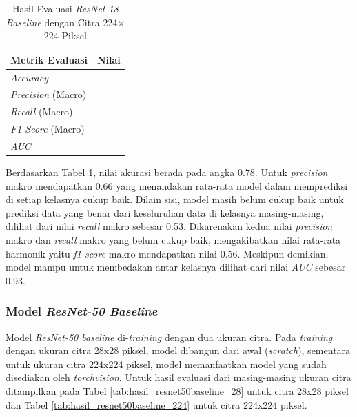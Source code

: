 \begin{table}[H]
    \centering
    \caption{Hasil Evaluasi \textit{ResNet-18 Baseline} dengan Citra 224$\times$224 Piksel}
    \label{tab:hasil_resnet18baseline_224}
    \begin{tabular}{>{\raggedright\arraybackslash}m{} 
                    >{\centering\arraybackslash}m{}}
        \toprule
        \textbf{Metrik Evaluasi} & \textbf{Nilai} \\
        \midrule
        \textit{Accuracy} & 0.78 \\
        \textit{Precision} (Macro) & 0.66 \\
        \textit{Recall} (Macro) & 0.53 \\
        \textit{F1-Score} (Macro) & 0.56 \\
        \textit{AUC} & 0.93 \\
        \bottomrule
    \end{tabular}
\end{table}

Berdasarkan Tabel \ref{tab:hasil_resnet18baseline_224}, nilai akurasi 
berada pada angka 0.78. Untuk \textit{precision} makro mendapatkan 0.66 
yang menandakan rata-rata model dalam memprediksi di setiap kelasnya 
cukup baik. Dilain sisi, model masih belum cukup baik untuk 
prediksi data yang benar dari keseluruhan data di kelasnya masing-masing, 
dilihat dari nilai \textit{recall} makro sebesar 0.53. Dikarenakan kedua 
nilai \textit{precision} makro dan \textit{recall} makro yang belum cukup 
baik, mengakibatkan nilai rata-rata harmonik yaitu \textit{f1-score} makro 
mendapatkan nilai 0.56. Meskipun demikian, model mampu untuk membedakan 
antar kelasnya dilihat dari nilai \textit{AUC} sebesar 0.93. \par


\subsubsection{Model \textit{ResNet-50 Baseline}} \label{IV.Resnet50_Baseline}
Model \textit{ResNet-50 baseline} di-\textit{training} dengan dua ukuran 
citra. Pada \textit{training} dengan ukuran citra 28x28 piksel, model 
dibangun dari awal (\textit{scratch}), sementara untuk ukuran citra 
224x224 piksel, model memanfaatkan model yang sudah disediakan oleh 
\textit{torchvision}. Untuk hasil evaluasi dari masing-masing ukuran citra 
ditampilkan pada Tabel \ref{tab:hasil_resnet50baseline_28} untuk citra 
28x28 piksel dan Tabel \ref{tab:hasil_resnet50baseline_224} untuk citra 224x224 piksel. \par


